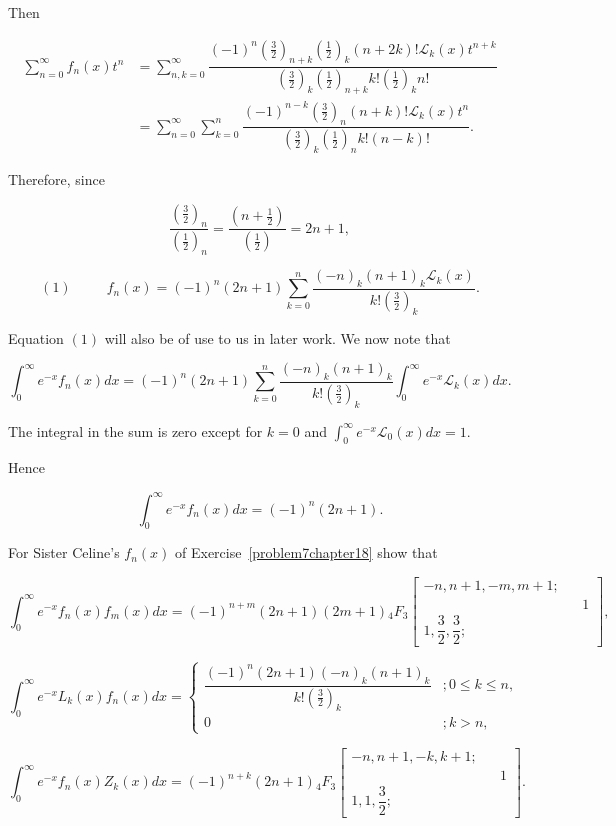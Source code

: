 \begin{solution}
Then

$$\begin{array}{ll}
\displaystyle\sum_{n=0}^{\infty} f_n(x) t^n &= \displaystyle\sum_{n,k=0}^{\infty} \dfrac{(-1)^n (\frac{3}{2})_{n+k} (\frac{1}{2})_k (n+2k)! \mathscr{L}_k(x)t^{n+k}}{(\frac{3}{2})_k (\frac{1}{2})_{n+k} k! (\frac{1}{2})_k n!} \\
&= \displaystyle\sum_{n=0}^{\infty} \displaystyle\sum_{k=0}^n \dfrac{(-1)^{n-k} (\frac{3}{2})_n (n+k)! \mathscr{L}_k(x) t^n}{(\frac{3}{2})_k (\frac{1}{2})_n k! (n-k)!}.
\end{array}$$

Therefore, since 

$$\dfrac{(\frac{3}{2})_n}{(\frac{1}{2})_n} = \dfrac{(n+\frac{1}{2})}{(\frac{1}{2})} = 2n+1,$$

$$(1) \hspace{30pt} f_n(x) = (-1)^n (2n+1) \displaystyle\sum_{k=0}^n \dfrac{(-n)_k (n+1)_k \mathscr{L}_k(x)}{k! (\frac{3}{2})_k}.$$

Equation $(1)$ will also be of use to us in later work. We now note that

$$\displaystyle\int_0^{\infty} e^{-x} f_n(x) dx = (-1)^n (2n+1) \displaystyle\sum_{k=0}^n \dfrac{(-n)_k (n+1)_k}{k! (\frac{3}{2})_k} \displaystyle\int_0^{\infty} e^{-x} \mathscr{L}_k(x) dx.$$

The integral in the sum is zero except for $k=0$ and $\displaystyle\int_0^{\infty} e^{-x} \mathscr{L}_0(x) dx = 1.$

Hence

$$\displaystyle\int_0^{\infty} e^{-x} f_n(x) dx = (-1)^n (2n+1).$$
\end{solution}
\begin{problem}\label{problem8chapter18}
For Sister Celine's $f_n(x)$ of Exercise~\ref{problem7chapter18} show that

$$\displaystyle\int_0^{\infty} e^{-x} f_n(x) f_m(x)dx = (-1)^{n+m}(2n+1)(2m+1){}_4F_3 \left[ \begin{array}{rlr}
-n,n+1,-m,m+1; & & \\
& & 1 \\
1, \dfrac{3}{2}, \dfrac{3}{2}; & & 
\end{array} \right],$$

$$\displaystyle\int_0^{\infty} e^{-x} L_k(x) f_n(x) dx = \left\{ \begin{array}{ll}
\dfrac{(-1)^n (2n+1)(-n)_k(n+1)_k}{k! (\frac{3}{2})_k} &; 0 \leq k \leq n, \\
0 &; k>n,
\end{array} \right.$$

$$\displaystyle\int_0^{\infty} e^{-x} f_n(x) Z_k(x) dx = (-1)^{n+k} (2n+1) {}_4F_3 \left[ \begin{array}{rlr}
-n, n+1, -k, k+1; & & \\
& & 1 \\
1,1, \dfrac{3}{2}; & & 
\end{array} \right].$$
\end{problem}
